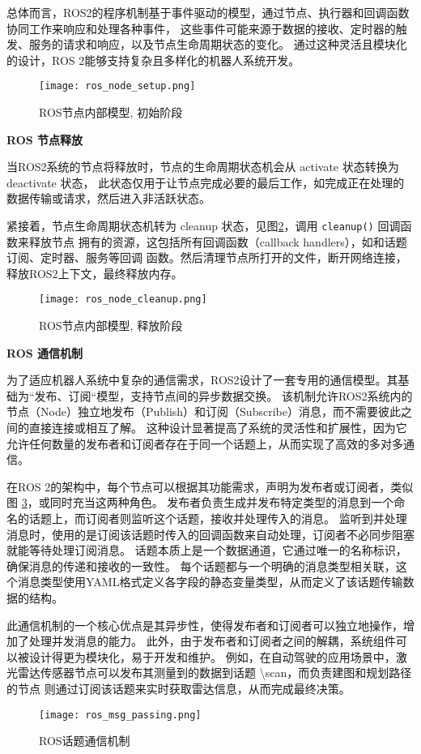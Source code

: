 总体而言，ROS2的程序机制基于事件驱动的模型，通过节点、执行器和回调函数协同工作来响应和处理各种事件，
这些事件可能来源于数据的接收、定时器的触发、服务的请求和响应，以及节点生命周期状态的变化。
通过这种灵活且模块化的设计，ROS 2能够支持复杂且多样化的机器人系统开发。


\begin{figure}[h]
    \centering
    \texttt{[image: ros\_node\_setup.png]}
    \caption{ROS节点内部模型, 初始阶段}
    \label{pic:rns}
\end{figure}

\textbf{ROS 节点释放}

当ROS2系统的节点将释放时，节点的生命周期状态机会从 activate 状态转换为 deactivate 状态，
此状态仅用于让节点完成必要的最后工作，如完成正在处理的数据传输或请求，然后进入非活跃状态。

紧接着，节点生命周期状态机转为 cleanup 状态，见图\ref{pic:rnc}，调用 \texttt{cleanup()} 回调函数来释放节点
拥有的资源，这包括所有回调函数（callback handlers），如和话题订阅、定时器、服务等回调
函数。然后清理节点所打开的文件，断开网络连接，释放ROS2上下文，最终释放内存。

\begin{figure}[h]
    \centering
    \texttt{[image: ros\_node\_cleanup.png]}
    \caption{ROS节点内部模型, 释放阶段}
    \label{pic:rnc}
\end{figure}

\textbf{ROS 通信机制}

为了适应机器人系统中复杂的通信需求，ROS2设计了一套专用的通信模型。其基础为“发布、订阅“模型，支持节点间的异步数据交换。
该机制允许ROS2系统内的节点（Node）独立地发布（Publish）和订阅（Subscribe）消息，而不需要彼此之间的直接连接或相互了解。
这种设计显著提高了系统的灵活性和扩展性，因为它允许任何数量的发布者和订阅者存在于同一个话题上，从而实现了高效的多对多通信。

在ROS 2的架构中，每个节点可以根据其功能需求，声明为发布者或订阅者，类似图 \ref{pic:rmp}，或同时充当这两种角色。
发布者负责生成并发布特定类型的消息到一个命名的话题上，而订阅者则监听这个话题，接收并处理传入的消息。
监听到并处理消息时，使用的是订阅该话题时传入的回调函数来自动处理，订阅者不必同步阻塞就能等待处理订阅消息。
话题本质上是一个数据通道，它通过唯一的名称标识，确保消息的传递和接收的一致性。
每个话题都与一个明确的消息类型相关联，这个消息类型使用YAML格式定义各字段的静态变量类型，从而定义了该话题传输数据的结构。

此通信机制的一个核心优点是其异步性，使得发布者和订阅者可以独立地操作，增加了处理并发消息的能力。
此外，由于发布者和订阅者之间的解耦，系统组件可以被设计得更为模块化，易于开发和维护。
例如，在自动驾驶的应用场景中，激光雷达传感器节点可以发布其测量到的数据到话题 \textbackslash scan，而负责建图和规划路径的节点
则通过订阅该话题来实时获取雷达信息，从而完成最终决策。


\begin{figure}[h]
    \centering
    \texttt{[image: ros\_msg\_passing.png]}
    \caption{ROS话题通信机制}
    \label{pic:rmp}
\end{figure}